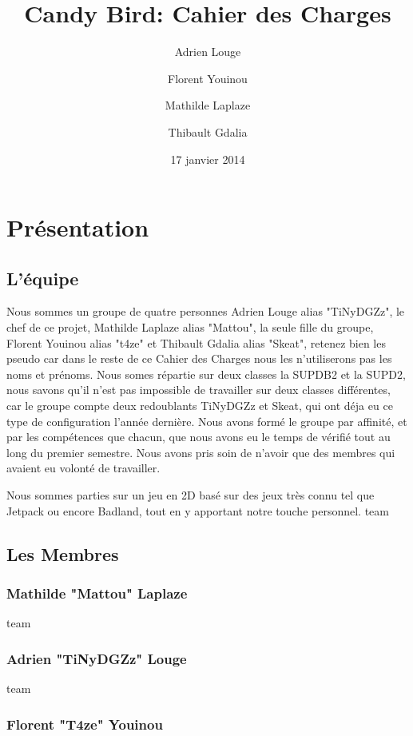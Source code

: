 \documentclass [11pt]{report}
\title {\textbf{ {Candy Bird: Cahier des Charges}}}
\author{Adrien Louge \and Florent Youinou \and Mathilde Laplaze \and Thibault Gdalia}
\date{17 janvier 2014}
\begin{document}
\renewcommand{\baselinestretch}{0.001}
\maketitle
\tableofcontents


\chapter {Pr\'esentation}
	\section{ L'\'equipe }
		Nous sommes un groupe de quatre personnes Adrien Louge alias "TiNyDGZz", le chef de ce projet, Mathilde Laplaze alias "Mattou", la seule fille du groupe, Florent Youinou alias "t4ze" et Thibault Gdalia alias "Skeat", retenez bien les pseudo car dans le reste de ce Cahier des Charges nous les n'utiliserons pas les noms et pr\'enoms. 		Nous somes r\'epartie sur deux classes la SUPDB2 et la SUPD2, nous savons qu'il n'est pas impossible de travailler sur deux classes diff\'erentes, car le groupe compte deux redoublants TiNyDGZz et Skeat, qui ont d\'eja eu ce type de configuration l'ann\'ee derni\`ere. Nous avons form\'e le groupe par affinit\'e, et par les comp\'etences 		que chacun, que nous avons eu le temps de v\'erifi\'e tout au long du premier semestre. Nous avons pris soin de n'avoir que des membres qui avaient eu volont\'e de travailler. 
	
	Nous sommes parties sur un jeu en 2D bas\'e sur des jeux tr\`es connu tel que Jetpack ou encore Badland, tout en y apportant notre touche personnel.
	\vfill
	team
	\newpage
	\section { Les Membres }
		\subsection {Mathilde "Mattou" Laplaze}
	
		\vfill
		team
		\newpage
		\subsection {Adrien "TiNyDGZz" Louge}
	
		\vfill
		team
		\newpage
		\subsection {Florent "T4ze" Youinou}
	
\end{document}
